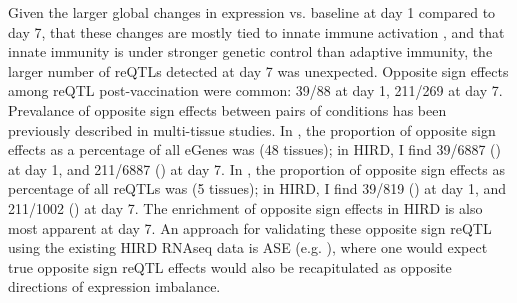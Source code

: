 Given the larger  global changes in expression vs. baseline at day 1 compared to day 7, 
that these changes are mostly tied to innate immune activation ,
and that innate immunity is under stronger genetic control than adaptive immunity\autocite{patin2018NaturalVariationParameters},
the larger number of \glspl{reQTL} detected at day 7 was unexpected.
Opposite sign effects among \gls{reQTL} post-vaccination were common: 39/88 at day 1, 211/269 at day 7.
Prevalance of opposite sign effects between pairs of conditions has been previously described in multi-tissue studies.
In \autocite{mizuno2019BiologicalCharacterizationExpression}, the proportion of opposite sign effects as a percentage of all eGenes was  (48 tissues);
in \gls{HIRD}, I find
39/6887 () at day 1,
and 211/6887 () at day 7.
In \autocite{fu2012UnravelingRegulatoryMechanisms}, the proportion of opposite sign effects as percentage of all reQTLs was  (5 tissues);
in \gls{HIRD}, I find
39/819 () at day 1,
and 211/1002 () at day 7.
The enrichment of opposite sign effects in \gls{HIRD} is also most apparent at day 7.
An approach for validating these opposite sign \gls{reQTL} using the existing \gls{HIRD} \gls{RNAseq} data is \gls{ASE} (e.g. \autocite{kumasaka2016FinemappingCellularQTLs}),
where one would expect true opposite sign \gls{reQTL} effects would also be recapitulated as opposite directions of expression imbalance.

